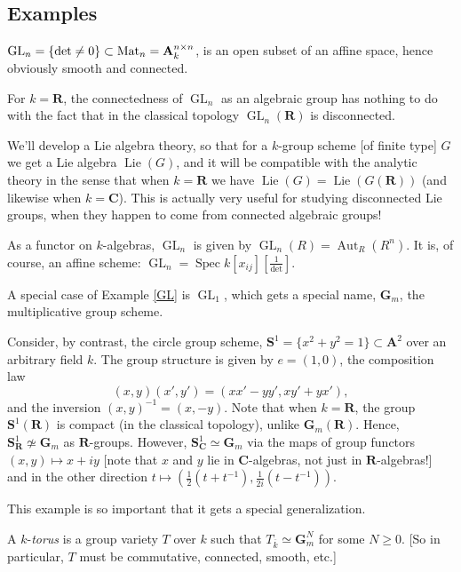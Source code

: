 \documentclass[10pt]{article}
\renewcommand{\AA}{\mathbf{A}}
\newcommand{\CC}{\mathbf{C}}
\newcommand{\RR}{\mathbf{R}}
\renewcommand{\SS}{\mathbf{S}}
\newcommand{\GL}{\operatorname{GL}}
\newcommand{\Lie}{\operatorname{Lie}}
\renewcommand{\(}{\left(}
\renewcommand{\)}{\right)}
\renewcommand{\bar}{\overline}
\DeclareMathOperator{\Aut}{Aut}
\newcommand{\Spec}{\operatorname{Spec}}
\numberwithin{thm}{subsection}
\begin{document}
\subsection{Examples}
\begin{ex}\label{GL} $\GL_n=\{\det\neq 0\}\subset {\rm{Mat}}_n=\AA^{n\times n}_k$,
is an open subset of an affine space, hence obviously smooth and connected.
\end{ex}

\begin{rem}
For $k = \RR$, the connectedness of $\GL_n$ as an algebraic group
has nothing to do with the fact that in the classical topology $\GL_n(\RR)$ is disconnected.
\end{rem}

\begin{rem}\label{foobarrem}
We'll develop a Lie algebra theory, so that for a $k$-group scheme [of finite type] $G$ we get a Lie algebra $\Lie(G)$, and it will be compatible with the analytic theory
in the sense that when $k=\RR$ we have $\Lie(G)=\Lie(G(\RR))$ (and likewise when $k = \CC$).
This is actually very useful for studying disconnected Lie groups, when they happen to come from connected algebraic groups!
\end{rem}
As a functor on $k$-algebras, $\GL_n$ is given by $\GL_n(R)=\Aut_R(R^n)$.
It is, of course, an affine scheme: $\GL_n=\Spec k[x_{ij}][\frac{1}{\det}]$.

\begin{ex}\label{circlegroup}
A special case of Example \ref{GL} is
$\GL_1$, which gets a special name, $\mathbf{G}_m$, the multiplicative group scheme.

Consider, by contrast, the circle group scheme, $\SS^1=\{x^2+y^2=1\}\subset \AA^2$
over an arbitrary field $k$. The group structure is given by $e=(1,0)$, the composition law
$$(x,y)(x',y')=(xx'-yy',xy'+yx'),$$
and the inversion $(x,y)^{-1}=(x,-y)$.
Note that when $k = \RR$, the group  $\SS^1(\RR)$ is compact (in the classical topology),
unlike $\mathbf{G}_m(\RR)$. Hence, $\SS^1_\RR\not\simeq \mathbf{G}_m$
as $\RR$-groups. However, $\SS^1_\CC\simeq \mathbf{G}_m$ via the maps of group functors
 $(x,y)\mapsto x+iy$ [note that $x$ and $y$ lie in $\CC$-algebras, not just in $\RR$-algebras!]
and in the other direction $t\mapsto (\frac{1}{2}(t+t^{-1}),\frac{1}{2i}(t-t^{-1}))$.
\end{ex}

This example is so important that it gets a special generalization.
\begin{defn}\label{torus}
A $k$-\textit{torus} is a group variety $T$ over $k$
such that $T_{\bar k}\simeq \mathbf{G}_m^N$ for some $N\geq 0$.
[So in particular, $T$ must be commutative, connected, smooth, etc.]
\end{defn}
\end{document}
